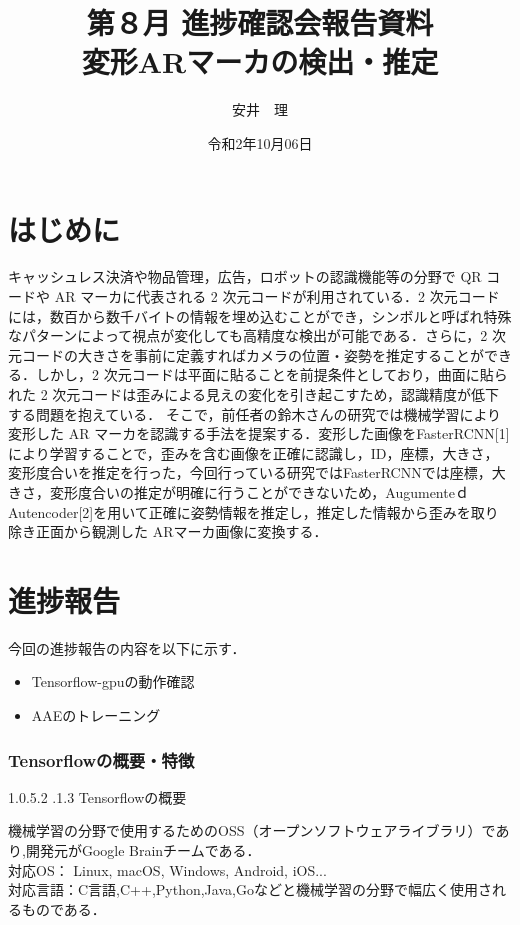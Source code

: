\documentclass[11pt,a4j,ascmac]{jarticle}
\title{第８月 進捗確認会報告資料\\
変形ARマーカの検出・推定}
\author{安井　理}
\date{令和2年10月06日}
\makeatletter
\newcommand{\subsubsubsection}{\@startsection{paragraph}{4}{\z@}%
  {1.0\Cvs \@plus.5\Cdp \@minus.2\Cdp}%
  {.1\Cvs \@plus.3\Cdp}%
  {\reset@font\sffamily\normalsize}
}
\makeatother
\begin{document}
\maketitle
\section{はじめに}
\quad  キャッシュレス決済や物品管理，広告，ロボットの認識機能等の分野で QR コードや AR マーカに代表される 2 次元コードが利用されている．2 次元コードには，数百から数千バイトの情報を埋め込むことができ，シンボルと呼ばれ特殊なパターンによって視点が変化しても高精度な検出が可能である．さらに，2 次元コードの大きさを事前に定義すればカメラの位置・姿勢を推定することができる．しかし，2 次元コードは平面に貼ることを前提条件としており，曲面に貼られた 2 次元コードは歪みによる見えの変化を引き起こすため，認識精度が低下する問題を抱えている．
そこで，前任者の鈴木さんの研究では機械学習により変形した AR マーカを認識する手法を提案する．変形した画像をFasterRCNN[1] により学習することで，歪みを含む画像を正確に認識し，ID，座標，大きさ，変形度合いを推定を行った，今回行っている研究ではFasterRCNNでは座標，大きさ，変形度合いの推定が明確に行うことができないため，Augumenteｄ　Autencoder[2]を用いて正確に姿勢情報を推定し，推定した情報から歪みを取り除き正面から観測した ARマーカ画像に変換する．

\section{進捗報告}
\quad 今回の進捗報告の内容を以下に示す．

\begin{itemize}

\item Tensorflow-gpuの動作確認
\item AAEのトレーニング

\end{itemize}


\subsubsection{Tensorflowの概要・特徴}


\subsubsubsection{Tensorflowの概要}

\quad 機械学習の分野で使用するためのOSS（オープンソフトウェアライブラリ）であり,開発元がGoogle Brainチームである．\\
\quad 対応OS： Linux, macOS, Windows, Android, iOS...　\\
\quad 対応言語：C言語,C++,Python,Java,Goなどと機械学習の分野で幅広く使用されるものである．
\end{document}
